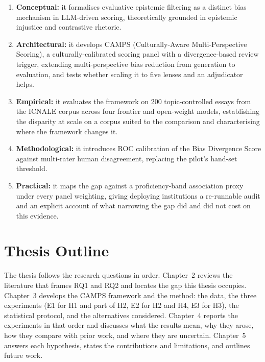 \begin{enumerate}
  \item \textbf{Conceptual:} it formalises evaluative epistemic
        filtering as a distinct bias mechanism in LLM-driven scoring,
        theoretically grounded in epistemic injustice and contrastive
        rhetoric.
  \item \textbf{Architectural:} it develops CAMPS (Culturally-Aware
        Multi-Perspective Scoring), a culturally-calibrated scoring
        panel with a divergence-based review trigger, extending
        multi-perspective bias reduction from generation to
        evaluation, and tests whether scaling it to five lenses and
        an adjudicator helps.
  \item \textbf{Empirical:} it evaluates the framework on 200
        topic-controlled essays from the ICNALE corpus
        \citep{ishikawa2023icnale} across four frontier and open-weight
        models, establishing the disparity at scale on a corpus
        suited to the comparison and characterising where the
        framework changes it.
  \item \textbf{Methodological:} it introduces ROC calibration of
        the Bias Divergence Score against multi-rater human
        disagreement, replacing the pilot's hand-set threshold.
  \item \textbf{Practical:} it maps the gap against a
        proficiency-band association proxy under every panel
        weighting, giving deploying institutions a re-runnable audit
        and an explicit account of what narrowing the gap did and did
        not cost on this evidence.
\end{enumerate}

\section{Thesis Outline}
\label{sec:outline}

The thesis follows the research questions in order. Chapter~2
reviews the literature that frames RQ1 and RQ2 and locates the gap
this thesis occupies. Chapter~3 develops the CAMPS framework and the
method: the data, the three experiments (E1 for H1 and part of H2,
E2 for H2 and H4, E3 for H3), the statistical protocol, and the alternatives
considered. Chapter~4 reports the experiments in that order and
discusses what the results mean, why they arose, how they compare
with prior work, and where they are uncertain. Chapter~5 answers each
hypothesis, states the contributions and limitations, and outlines
future work.
